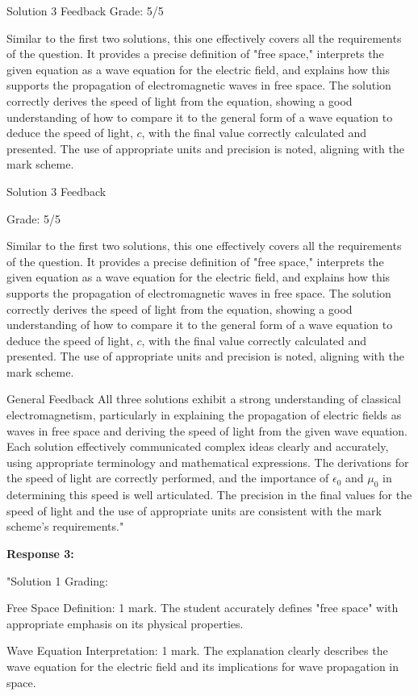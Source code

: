 \documentclass[a4paper,11pt]{article}
\begin{document}
Solution 3 Feedback
Grade: 5/5

Similar to the first two solutions, this one effectively covers all the requirements of the question. It provides a precise definition of "free space," interprets the given equation as a wave equation for the electric field, and explains how this supports the propagation of electromagnetic waves in free space. The solution correctly derives the speed of light from the equation, showing a good understanding of how to compare it to the general form of a wave equation to deduce the speed of light, \(c\), with the final value correctly calculated and presented. The use of appropriate units and precision is noted, aligning with the mark scheme.

Solution 3 Feedback

Grade: 5/5

Similar to the first two solutions, this one effectively covers all the requirements of the question. It provides a precise definition of "free space," interprets the given equation as a wave equation for the electric field, and explains how this supports the propagation of electromagnetic waves in free space. The solution correctly derives the speed of light from the equation, showing a good understanding of how to compare it to the general form of a wave equation to deduce the speed of light, \(c\), with the final value correctly calculated and presented. The use of appropriate units and precision is noted, aligning with the mark scheme.

General Feedback
All three solutions exhibit a strong understanding of classical electromagnetism, particularly in explaining the propagation of electric fields as waves in free space and deriving the speed of light from the given wave equation. Each solution effectively communicated complex ideas clearly and accurately, using appropriate terminology and mathematical expressions. The derivations for the speed of light are correctly performed, and the importance of \(\epsilon_0\) and \(\mu_0\) in determining this speed is well articulated. The precision in the final values for the speed of light and the use of appropriate units are consistent with the mark scheme's requirements."

\textbf{Response 3:}

"Solution 1 Grading:

Free Space Definition: 1 mark. The student accurately defines "free space" with appropriate emphasis on its physical properties.

Wave Equation Interpretation: 1 mark. The explanation clearly describes the wave equation for the electric field and its implications for wave propagation in space.
\end{document}
